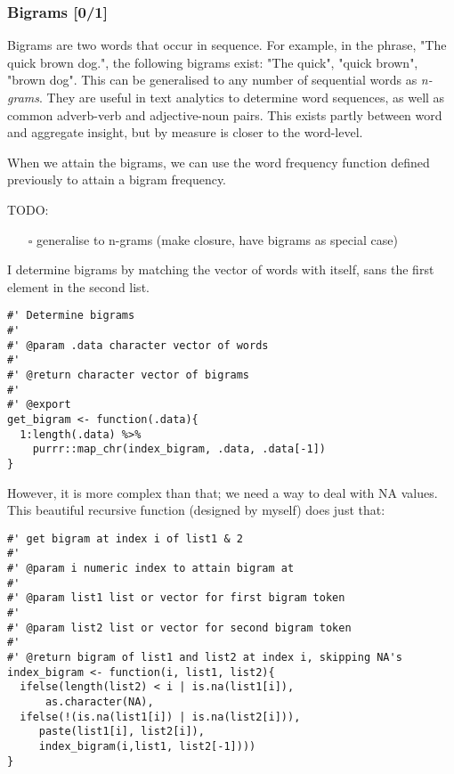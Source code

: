 \documentclass[a4paper, 11pt]{article}
\begin{document}
\subsubsection{Bigrams [0/1]}
\label{sec:orgb27c210}
Bigrams are two words that occur in sequence. For example, in the
phrase, "The quick brown dog.", the following bigrams exist: "The
quick", "quick brown", "brown dog". This can be generalised to any
number of sequential words as \emph{n-grams}. They are useful in text
analytics to determine word sequences, as well as common adverb-verb
and adjective-noun pairs. This exists partly between word and
aggregate insight, but by measure is closer to the word-level.

When we attain the bigrams, we can use the word frequency function
defined previously to attain a bigram frequency.

TODO:
\begin{itemize}
\item[{$\square$}] generalise to n-grams (make closure, have bigrams as special
case)
\end{itemize}

I determine bigrams by matching the vector of words with itself, sans
the first element in the second list.
\begin{verbatim}
#' Determine bigrams
#'
#' @param .data character vector of words
#'
#' @return character vector of bigrams
#'
#' @export
get_bigram <- function(.data){
  1:length(.data) %>%
    purrr::map_chr(index_bigram, .data, .data[-1])
}
\end{verbatim}

However, it is more complex than that; we need a way to deal with NA
values. This beautiful recursive function (designed by myself) does
just that:

\begin{verbatim}
#' get bigram at index i of list1 & 2
#'
#' @param i numeric index to attain bigram at
#'
#' @param list1 list or vector for first bigram token
#'
#' @param list2 list or vector for second bigram token
#'
#' @return bigram of list1 and list2 at index i, skipping NA's
index_bigram <- function(i, list1, list2){
  ifelse(length(list2) < i | is.na(list1[i]),
	  as.character(NA),
  ifelse(!(is.na(list1[i]) | is.na(list2[i])),
	 paste(list1[i], list2[i]),
	 index_bigram(i,list1, list2[-1])))
}
\end{verbatim}
\end{document}
